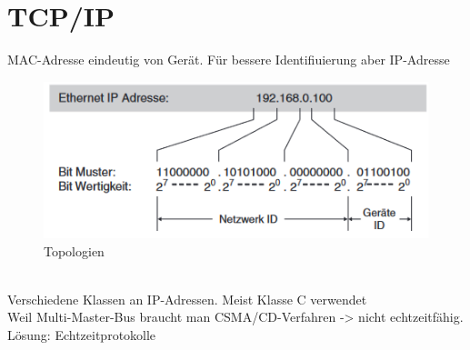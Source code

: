 \documentclass[ a4paper,
                oneside,
                toc=bibliography,
                toc=listof
                ]{scrbook}
\begin{document}
	\section{TCP/IP}
   
   	MAC-Adresse eindeutig von Gerät. Für bessere Identifiuierung aber IP-Adresse
   	\begin{figure}[h]
   		\centering
   		\includegraphics[width=0.70\linewidth]{./images/IP Adresse Aufbau.png}
   		\caption{Topologien}
   		\label{fig:Topologien}
   	\end{figure}
   \\
  Verschiedene Klassen an IP-Adressen. Meist Klasse C verwendet
  \\
  Weil Multi-Master-Bus braucht man CSMA/CD-Verfahren -> nicht echtzeitfähig. Lösung: Echtzeitprotokolle
  \\
  
  
   
   
    \backmatter
    \cleardoublepage
    \printbibliography

    \cleardoublepage
    \listoffigures
    \cleardoublepage
    \listoftables
    \cleardoublepage

\end{document}
